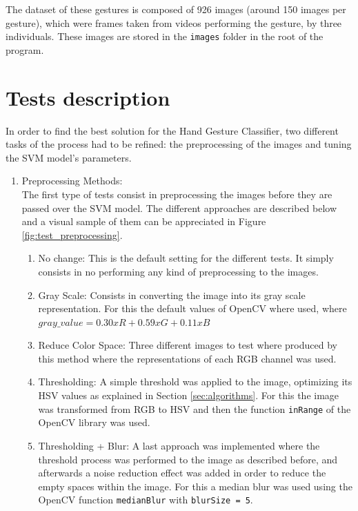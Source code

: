 \documentclass[a4paper,10pt,english]{article}
\begin{document}
         The dataset of these gestures is composed of 926 images (around 150 images per gesture), which were frames taken from videos performing the gesture, by three individuals. These images are stored in the \texttt{images} folder in the root of the program.
         
         
    \section{Tests description}\label{sec:tests}
        
        In order to find the best solution for the Hand Gesture Classifier, two different tasks of the process had to be refined: the preprocessing of the images and tuning the SVM model's parameters.
        
        \begin{enumerate}
            \item Preprocessing Methods:\\
            The first type of tests consist in preprocessing the images before they are passed over the SVM model. The different approaches are described below and a visual sample of them can be appreciated in Figure \ref{fig:test_preprocessing}.
            \begin{enumerate}
                \item No change: This is the default setting for the different tests. It simply consists in no performing any kind of preprocessing to the images.
                \item Gray Scale: Consists in converting the image into its gray scale representation. For this the default values of OpenCV where used, where $gray\_value = 0.30xR + 0.59xG + 0.11xB$
                \item Reduce Color Space: Three different images to test where produced by this method where the representations of each RGB channel was used.
                \item Thresholding: A simple threshold was applied to the image, optimizing its HSV values as explained in Section \ref{sec:algorithms}. For this the image was transformed from RGB to HSV and then the function \texttt{inRange} of the OpenCV library was used.
                \item Thresholding + Blur: A last approach was implemented where the threshold process was performed to the image as described before, and afterwards a noise reduction effect was added in order to reduce the empty spaces within the image. For this a median blur was used using the OpenCV function \texttt{medianBlur} with \texttt{blurSize = 5}.
            \end{enumerate}


\end{enumerate}
\end{document}
